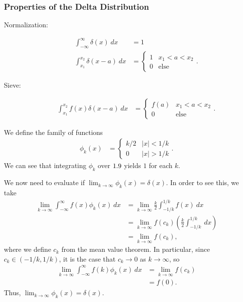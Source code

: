 \documentclass[10pt]{mypackage}
\begin{document}
\subsubsection{Properties of the Delta Distribution}%
\begin{description}
  \item[Normalization:]
    \begin{align*}
      \int_{-\infty}^{\infty} \delta(x)\:dx &= 1\\
      \int_{x_1}^{x_2} \delta(x-a)\:dx &= \begin{cases}
        1 & x_1 < a < x_2\\
        0 & \text{else}
      \end{cases}.
    \end{align*}
  \item[Sieve:]
    \begin{align*}
      \int_{x_1}^{x_2} f(x)\delta(x-a)\:dx &= \begin{cases}
        f(a) & x_1 < a < x_2\\
        0 & \text{else}
      \end{cases}.
    \end{align*}
\end{description}
\begin{example}
  We define the family of functions
  \begin{align*}
    \phi_k(x) &= \begin{cases}
      k/2 & |x| < 1/k\\
      0 & |x| > 1/k
    \end{cases}.
  \end{align*}
  We can see that integrating $\phi_k$ over $1.9$ yields $1$ for each $k$.\newline

  We now need to evaluate if $\lim_{k\rightarrow\infty}\phi_k(x) = \delta(x)$. In order to see this, we take
  \begin{align*}
    \lim_{k\rightarrow\infty}\int_{-\infty}^{\infty} f(x)\phi_k(x)\:dx &= \lim_{k\rightarrow\infty}\frac{k}{2}\int_{-1/k}^{1/k} f(x)\:dx\\
                                                                       &= \lim_{k\rightarrow\infty}f\left(c_k\right)\left(\frac{k}{2}\int_{-1/k}^{1/k} \:dx\right)\\
                                                                       &= \lim_{k\rightarrow\infty}f\left(c_k\right),
  \end{align*}
  where we define $c_k$ from the mean value theorem. In particular, since $c_k \in \left(-1/k,1/k\right)$, it is the case that $c_k\rightarrow 0$ as $k\rightarrow\infty$, so
  \begin{align*}
    \lim_{k\rightarrow\infty}\int_{-\infty}^{\infty} f(k)\phi_k(x)\:dx &= \lim_{k\rightarrow\infty}f\left(c_k\right)\\
                                                                       &= f(0).
  \end{align*}
  Thus, $\lim_{k\rightarrow\infty}\phi_k(x) = \delta(x)$.
\end{example}
\end{document}
